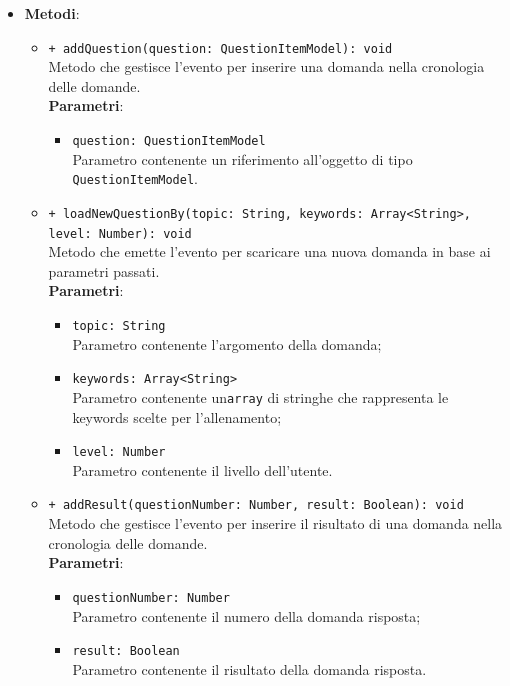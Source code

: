 \begin{itemize}
\begin{itemize}
		\end{itemize}
		\item \textbf{Metodi}: 
		\begin{itemize}
			\item \texttt{+ addQuestion(question: QuestionItemModel): void} \\
			Metodo che gestisce l'evento per inserire una domanda nella cronologia delle domande. \\
			\textbf{Parametri}:
			\begin{itemize}
				\item \texttt{question: QuestionItemModel} \\
				Parametro contenente un riferimento all'oggetto di tipo \texttt{QuestionItemModel}.
			\end{itemize}
			\item \texttt{+ loadNewQuestionBy(topic: String, keywords: Array<String>, \\level: Number): void} \\
			Metodo che emette l'evento per scaricare una nuova domanda in base ai parametri passati. \\
			\textbf{Parametri}:
			\begin{itemize}
				\item \texttt{topic: String} \\
				Parametro contenente l'argomento della domanda;
				\item \texttt{keywords: Array<String>} \\
				Parametro contenente un\texttt{array} di stringhe che rappresenta le keywords scelte per l'allenamento;
				\item \texttt{level: Number} \\
				Parametro contenente il livello dell'utente.
			\end{itemize}
			\item \texttt{+ addResult(questionNumber: Number, result: Boolean): void} \\
			Metodo che gestisce l'evento per inserire il risultato di una domanda nella cronologia delle domande. \\
			\textbf{Parametri}:
			\begin{itemize}
				\item \texttt{questionNumber: Number} \\
				Parametro contenente il numero della domanda risposta;
				\item \texttt{result: Boolean} \\
				Parametro contenente il risultato della domanda risposta.

\end{itemize}
\end{itemize}
\end{itemize}

